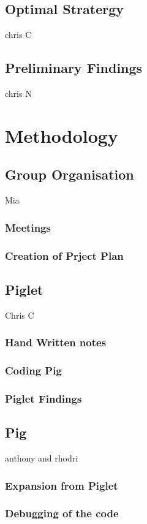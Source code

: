 \documentclass[a4paper,titlepage]{article}
\begin{document}
\subsection{Optimal Stratergy}
chris C
\subsection{Preliminary Findings}
chris N


\section{Methodology}
\subsection{Group Organisation}
Mia
\subsubsection{Meetings}
\subsubsection{Creation of Prject Plan}

\subsection{Piglet}
Chris C
\subsubsection{Hand Written notes}
\subsubsection{Coding Pig}
\subsubsection{Piglet Findings}

\subsection{Pig}
anthony and rhodri
\subsubsection{Expansion from Piglet}
\subsubsection{Debugging of the code}
\end{document}
